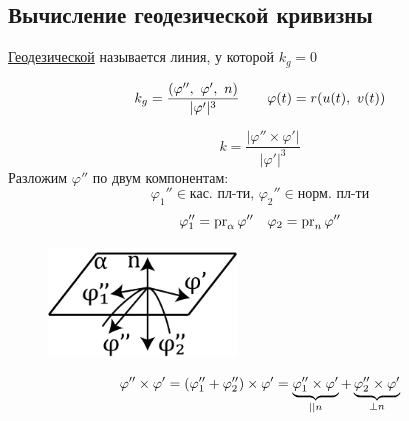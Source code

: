 \documentclass[main]{subfiles}
\begin{document}
    \subsection{Вычисление геодезической кривизны}
    \begin{definition}
        \ul{Геодезической} называется линия, у которой $k_g = 0$
    \end{definition}

    \begin{Utv}[формула]
        \[k_g = \frac{(\varphi'',\ \varphi',\ n)}{|\varphi'|^3} \qq \varphi(t) = r(u(t),\ v(t))\]
    \end{Utv}

    \begin{Proof}
        \[k = \frac{|\varphi'' \times \varphi'|}{|\varphi'|^3}\]
        Разложим $\varphi''$ по двум компонентам:
        \[\varphi_1'' \in \text{кас. пл-ти, } \varphi_2'' \in \text{норм. пл-ти}\]
        \[\varphi_1'' = \pr_{\alpha} \varphi'' \q \varphi_2 = \pr_n \varphi''\]
        \begin{figure}[H]
            \includegraphics[width=5cm]{pics/11_3.png}
            \centering
        \end{figure}
        \[\varphi'' \times \varphi' = (\varphi''_1 + \varphi''_2) \times \varphi' = \ub{||n}{\varphi''_1 \times \varphi'} + \ub{\bot n}{\varphi''_2 \times \varphi'}\]
    \end{Proof}
\end{document}
